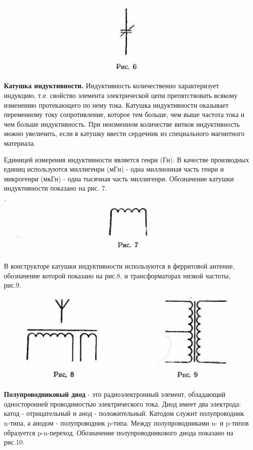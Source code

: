\documentclass[12pt]{article}
\begin{document}
\includegraphics[scale=0.8]{ekon3_010_1}

\textbf{Катушка индуктивности.} Индуктивность количественно характеризует индукцию, т.е. свойство элемента электрической цепи препятствовать всякому изменению протекающего по нему тока. Катушка индуктивности оказывает переменному току сопротивление, которое тем больше, чем выше частота тока и чем больше индуктивность. При неизменном количестве витков индуктивность можно увеличить, если в катушку ввести сердечник из специального магнитного материала.

Единицей измерения индуктивности является генри (Гн). В качестве производных единиц используются миллигенри (мГн) - одна миллионная часть генри и микрогенри (мкГн) - одна тысячная часть миллигенри. Обозначение катушки индуктивности показано на рис. 7.

\includegraphics[scale=0.8]{ekon3_010_2}

В конструкторе катушки индуктивности используются в ферритовой антенне, обозначение которой показано на рис.8, и трансформаторах низкой частоты, рис.9.

\includegraphics[scale=0.8]{ekon3_010_3}

\newpage
\textbf{Полупроводниковый диод} - это радиоэлектронный элемент, обладающий односторонней проводимостью электрического тока. Диод имеет два электрода: катод - отрицательный и анод - положительный. Катодом служит полупроводник n-типа, а анодом - полупроводник p-типа. Между полупроводниками n- и p-типов образуется p-n-переход. Обозначение полупроводникового диода показано на рис.10.
\end{document}
